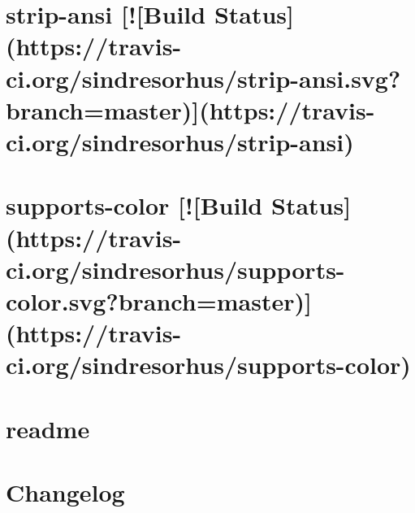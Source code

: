 \documentclass[twoside]{book}
\newcommand{\+}{\discretionary{\mbox{\scriptsize$\hookleftarrow$}}{}{}}
\begin{document}
\chapter{strip-\/ansi \mbox{[}!\mbox{[}Build Status\mbox{]}(https\+://travis-\/ci.org/sindresorhus/strip-\/ansi.svg?branch=master)\mbox{]}(https\+://travis-\/ci.org/sindresorhus/strip-\/ansi)}
\label{md__c_1__users_martin__documents__git_hub_visual_studio__bachelor__wis_r__wis_r_node_modules_gru455f8dc86f448fc41bb71c1a76a40586}
\hypertarget{md__c_1__users_martin__documents__git_hub_visual_studio__bachelor__wis_r__wis_r_node_modules_gru455f8dc86f448fc41bb71c1a76a40586}{}

\chapter{supports-\/color \mbox{[}!\mbox{[}Build Status\mbox{]}(https\+://travis-\/ci.org/sindresorhus/supports-\/color.svg?branch=master)\mbox{]}(https\+://travis-\/ci.org/sindresorhus/supports-\/color)}
\label{md__c_1__users_martin__documents__git_hub_visual_studio__bachelor__wis_r__wis_r_node_modules_gru02276bb4b2f5805c17b06d8a6efa326d}
\hypertarget{md__c_1__users_martin__documents__git_hub_visual_studio__bachelor__wis_r__wis_r_node_modules_gru02276bb4b2f5805c17b06d8a6efa326d}{}

\chapter{readme}
\label{md__c_1__users_martin__documents__git_hub_visual_studio__bachelor__wis_r__wis_r_node_modules_gru5087e5614be4d97a17a19124b0f6eb03}
\hypertarget{md__c_1__users_martin__documents__git_hub_visual_studio__bachelor__wis_r__wis_r_node_modules_gru5087e5614be4d97a17a19124b0f6eb03}{}

\chapter{Changelog}
\label{md__c_1__users_martin__documents__git_hub_visual_studio__bachelor__wis_r__wis_r_node_modules_grubdf4532ca9bc686de27dd937844b6c02}
\hypertarget{md__c_1__users_martin__documents__git_hub_visual_studio__bachelor__wis_r__wis_r_node_modules_grubdf4532ca9bc686de27dd937844b6c02}{}

\end{document}
